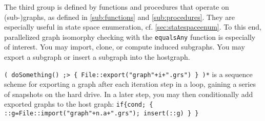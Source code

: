 The third group is defined by functions and procedures that operate on (sub-)graphs, as defined in \ref{sub:functions} and \ref{sub:procedures}.
They are especially useful in state space enumeration, cf. \ref{sec:statespaceenum}.
To this end, parallelized graph isomorphy checking with the \texttt{equalsAny} function is especially of interest.
You may import, clone, or compute induced subgraphs.
You may export a subgraph or insert a subgraph into the hostgraph.

\begin{example}
\verb#( doSomething() ;> { File::export("graph"+i+".grs") } )*# is a sequence scheme for exporting a graph after each iteration step in a loop, gaining a series of snapshots on the hard drive.
In a later step, you may then conditionally add exported graphs to the host graph: 
\verb#if{cond; { ::g=File::import("graph"+n.a+".grs"); insert(::g) } }#
\end{example}


